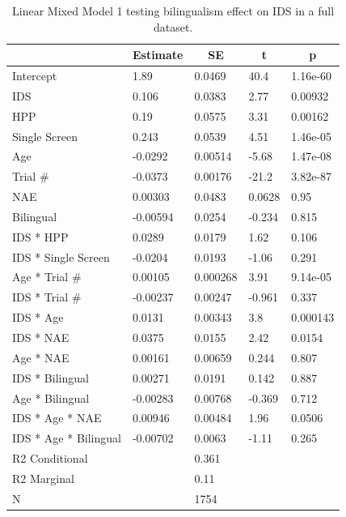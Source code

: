 \documentclass[
  english,
  ,man,floatsintext]{apa6}
\begin{document}
\begin{table}[tbp]
\begin{center}
\begin{threeparttable}
\caption{\label{tab:unnamed-chunk-10}Linear Mixed Model 1 testing bilingualism effect on IDS in a full dataset.}
\begin{tabular}{lllll}
\toprule
 & \multicolumn{1}{c}{Estimate} & \multicolumn{1}{c}{SE} & \multicolumn{1}{c}{t} & \multicolumn{1}{c}{p}\\
\midrule
Intercept & 1.89 & 0.0469 & 40.4 & 1.16e-60\\
IDS & 0.106 & 0.0383 & 2.77 & 0.00932\\
HPP & 0.19 & 0.0575 & 3.31 & 0.00162\\
Single Screen & 0.243 & 0.0539 & 4.51 & 1.46e-05\\
Age & -0.0292 & 0.00514 & -5.68 & 1.47e-08\\
Trial \# & -0.0373 & 0.00176 & -21.2 & 3.82e-87\\
NAE & 0.00303 & 0.0483 & 0.0628 & 0.95\\
Bilingual & -0.00594 & 0.0254 & -0.234 & 0.815\\
IDS * HPP & 0.0289 & 0.0179 & 1.62 & 0.106\\
IDS * Single Screen & -0.0204 & 0.0193 & -1.06 & 0.291\\
Age * Trial \# & 0.00105 & 0.000268 & 3.91 & 9.14e-05\\
IDS * Trial \# & -0.00237 & 0.00247 & -0.961 & 0.337\\
IDS * Age & 0.0131 & 0.00343 & 3.8 & 0.000143\\
IDS * NAE & 0.0375 & 0.0155 & 2.42 & 0.0154\\
Age * NAE & 0.00161 & 0.00659 & 0.244 & 0.807\\
IDS * Bilingual & 0.00271 & 0.0191 & 0.142 & 0.887\\
Age * Bilingual & -0.00283 & 0.00768 & -0.369 & 0.712\\
IDS * Age * NAE & 0.00946 & 0.00484 & 1.96 & 0.0506\\
IDS * Age * Bilingual & -0.00702 & 0.0063 & -1.11 & 0.265\\ \midrule
R2 Conditional &  & 0.361 &  & \\
R2 Marginal &  & 0.11 &  & \\ \midrule
N &  & 1754 &  & \\
\bottomrule
\end{tabular}
\end{threeparttable}
\end{center}
\end{table}
\end{document}
